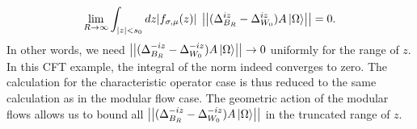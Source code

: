\documentclass[a4paper,11pt]{article}
\theoremstyle{definition}
\begin{document}
\begin{align}
    \lim_{R\to\infty}\int_{|z|<s_0} dz |f_{\sigma,\mu}(z)|\;\left|\left|(\Delta_{B_R}^{iz} - \Delta_{W_0}^{iz})A\ket{\Omega}\right|\right| = 0.
\end{align} In other words, we need $\left|\left|(\Delta_{B_{R}}^{-iz} - \Delta_{W_0}^{-iz})A\ket{\Omega}\right|\right| \to 0$ uniformly for the range of $z$. In this CFT example, the integral of the norm indeed converges to zero. The calculation for the characteristic operator case is thus reduced to the same calculation as in the modular flow case. The geometric action of the modular flows allows us to bound all $\left|\left|(\Delta_{B_{R}}^{-iz} - \Delta_{W_0}^{-iz})A\ket{\Omega}\right|\right|$ in the truncated range of $z$.




\end{document}
